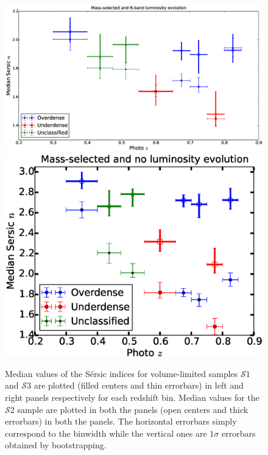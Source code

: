 \documentclass[twocolumn,useAMS,usenatbib]{mn2e}
\newcommand{\sersic}{S\'{e}rsic }
\newcommand{\s}{\ensuremath{\mathcal{S}}}
\begin{document}
\begin{figure}
 \includegraphics[width=1.1\columnwidth]{median_sersicn}
 \includegraphics[width=1.1\columnwidth]{median_sersicn2}
 \caption{Median values of the \sersic indices for volume-limited samples \s$1$ and \s$3$ are plotted (filled centers and thin errorbars) in left and right panels respectively for each redshift bin.
          Median values for the \s$2$ sample are plotted in both the panels (open centers and thick errorbars) in both the panels.
          The horizontal errorbars simply correspond to the binwidth while the vertical ones are $1\sigma$ errorbars obtained by bootstrapping.}
 \label{fig:median_sersicn}
\end{figure}
\end{document}
